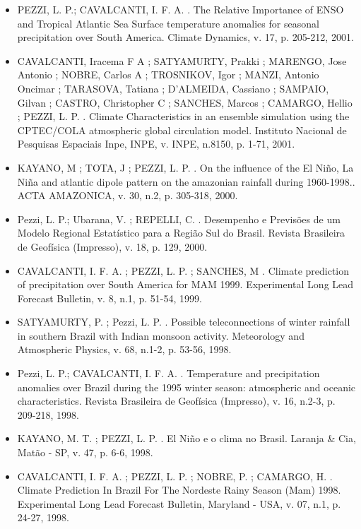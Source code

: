 \documentclass[11pt, a4paper]{awesome-cv}
\begin{document}
\begin{cvletter}
\begin{itemize}
  \item[] PEZZI, L. P.; CAVALCANTI, I. F. A. . The Relative Importance of ENSO and Tropical 
  Atlantic Sea Surface temperature anomalies for seasonal precipitation over South America. 
  Climate Dynamics, v. 17, p. 205-212, 2001. 

  \item[] CAVALCANTI, Iracema F A ; SATYAMURTY, Prakki ; MARENGO, Jose Antonio ; NOBRE, Carlos A ;
  TROSNIKOV, Igor ; MANZI, Antonio Oncimar ; TARASOVA, Tatiana ; D'ALMEIDA, Cassiano ; SAMPAIO, 
  Gilvan ; CASTRO, Christopher C ; SANCHES, Marcos ; CAMARGO, Hellio ; PEZZI, L. P. . Climate 
  Characteristics in an ensemble simulation using the CPTEC/COLA atmospheric global circulation 
  model. Instituto Nacional de Pesquisas Espaciais Inpe, INPE, v. INPE, n.8150, p. 1-71, 2001. 

  \item[] KAYANO, M ; TOTA, J ; PEZZI, L. P. . On the influence of the El Niño, La Niña and atlantic
  dipole pattern on the amazonian rainfall during 1960-1998.. ACTA AMAZONICA, v. 30, n.2, p. 
  305-318, 2000. 

  \item[] Pezzi, L. P.; Ubarana, V. ; REPELLI, C. . Desempenho e Previsões de um Modelo Regional 
  Estatístico para a Região Sul do Brasil. Revista Brasileira de Geofísica (Impresso), v. 18, 
  p. 129, 2000. 

  \item[] CAVALCANTI, I. F. A. ; PEZZI, L. P. ; SANCHES, M . Climate prediction of precipitation 
  over South America for MAM 1999. Experimental Long Lead Forecast Bulletin, v. 8, n.1, p. 
  51-54, 1999. 

  \item[] SATYAMURTY, P. ; Pezzi, L. P. . Possible teleconnections of winter rainfall in southern 
  Brazil with Indian monsoon activity. Meteorology and Atmospheric Physics, v. 68, n.1-2, p. 
  53-56, 1998. 

  \item[] Pezzi, L. P.; CAVALCANTI, I. F. A. . Temperature and precipitation anomalies over Brazil
  during the 1995 winter season: atmospheric and oceanic characteristics. Revista Brasileira de 
  Geofísica (Impresso), v. 16, n.2-3, p. 209-218, 1998. 
  
  \item[] KAYANO, M. T. ; PEZZI, L. P. . El Niño e o clima no Brasil. Laranja \& Cia, Matão - SP, v. 
  47, p. 6-6, 1998. 

  \item[] CAVALCANTI, I. F. A. ; PEZZI, L. P. ; NOBRE, P. ; CAMARGO, H. . Climate Prediction In Brazil 
  For The Nordeste Rainy Season (Mam) 1998. Experimental Long Lead Forecast Bulletin, Maryland - 
  USA, v. 07, n.1, p. 24-27, 1998. 


\end{itemize}
\end{cvletter}
\end{document}
